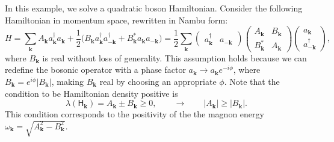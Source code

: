 \documentclass[aps, prx, nofootinbib, superscriptaddress]{revtex4-2}
\newcommand{\kvec}{\mathbf{k}}
\begin{document}
In this example, we solve a quadratic boson Hamiltonian. Consider the following Hamiltonian in momentum space, rewritten in Nambu form:
\begin{equation}
    H = \sum_{\mathbf{k}} A_{\mathbf{k}} a^{\dagger}_{\mathbf{k}} a_{\mathbf{k}} + \frac{1}{2} \Big( B_{\mathbf{k}} a^{\dagger}_{\mathbf{k}} a^{\dagger}_{-\mathbf{k}} + B_{\mathbf{k}}^{*} a_{\mathbf{k}} a_{-\mathbf{k}} \Big) 
    = \frac{1}{2} \sum_{\mathbf{k}}
    \begin{pmatrix}
        a^{\dagger}_{\mathbf{k}} & a_{-\mathbf{k}}
    \end{pmatrix}
    \begin{pmatrix}
        A_{\mathbf{k}} & B_{\mathbf{k}} \\
        B_{\mathbf{k}}^{*} & A_{\mathbf{k}}
    \end{pmatrix}
    \begin{pmatrix}
        a_{\mathbf{k}} \\
        a^{\dagger}_{-\mathbf{k}}
    \end{pmatrix},
\end{equation}
where $ B_{\mathbf{k}} $ is real without loss of generality. This assumption holds because we can redefine the bosonic operator with a phase factor $ a_{\mathbf{k}} \to a_{\mathbf{k}} e^{-i\phi} $, where $ B_{\mathbf{k}} = e^{i\phi} |B_{\mathbf{k}}| $, making $ B_{\mathbf{k}} $ real by choosing an appropriate $ \phi $.
Note that the condition to be Hamiltonian density positive is 
\begin{equation*}
    \lambda(\mathsf{H}_{\kvec}) = A_{\kvec} \pm B_{\kvec} \ge 0, 
    \qquad \rightarrow \qquad
    | A_{\kvec} | \ge | B_{\kvec} |.
\end{equation*}
This condition corresponds to the positivity of the the magnon energy $\omega_{\kvec} = \sqrt{A_{\kvec}^{2} - B_{\kvec}^{2}}$.
\end{document}
